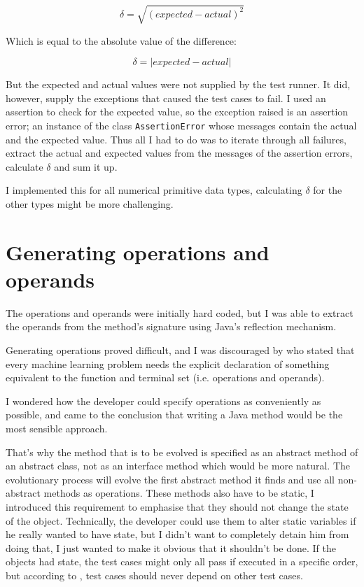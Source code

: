\documentclass[a4paper]{article}
\begin{document}
\[\delta = \sqrt{(expected - actual)^2}\]

Which is equal to the absolute value of the difference:

\[\delta = |expected - actual|\]

But the expected and actual values were not supplied by the test
runner. It did, however, supply the exceptions that caused the test
cases to fail. I used an assertion to check for the expected value, so
the exception raised is an assertion error; an instance of the class
\verb!AssertionError!  whose messages contain the actual and the
expected value. Thus all I had to do was to iterate through all
failures, extract the actual and expected values from the messages of
the assertion errors, calculate $\delta$ and sum it up.

I implemented this for all numerical primitive data types, calculating
$\delta$ for the other types might be more challenging.

\section{Generating operations and operands}

The operations and operands were initially hard coded, but I was able
to extract the operands from the method's signature using Java's
reflection mechanism.

Generating operations proved difficult, and I was discouraged by
\cite{koza1992} who stated that every machine learning problem needs
the explicit declaration of something equivalent to the function and
terminal set (i.e. operations and operands).

I wondered how the developer could specify operations as conveniently
as possible, and came to the conclusion that writing a Java method
would be the most sensible approach.

That's why the method that is to be evolved is specified as an
abstract method of an abstract class, not as an interface method which
would be more natural. The evolutionary process will evolve the first
abstract method it finds and use all non-abstract methods as
operations. These methods also have to be static, I introduced this
requirement to emphasise that they should not change the state of the
object. Technically, the developer could use them to alter static
variables if he really wanted to have state, but I didn't want to
completely detain him from doing that, I just wanted to make it
obvious that it shouldn't be done. If the objects had state, the test
cases might only all pass if executed in a specific order, but
according to \cite{beck2002}, test cases should never depend on other
test cases.
\end{document}
